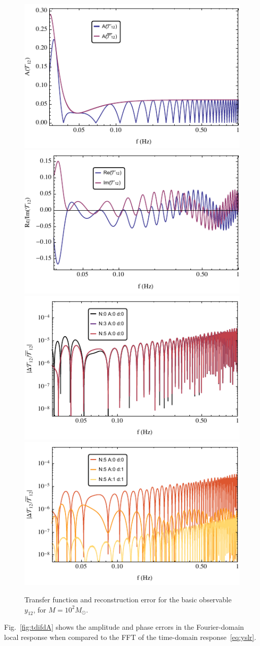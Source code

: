 \documentclass[aps,showpacs,twocolumn,
prd,superscriptaddress,nofootinbib]{revtex4-1}
\newcommand{\Msol}{M_{\odot}}
\begin{document}
\begin{figure}
  \centering
  \includegraphics[width=.48\linewidth]{plots/LISAtransferM1e2y12Lamp.pdf}
  \hspace{0.2cm}
  \includegraphics[width=.48\linewidth]{plots/LISAtransferM1e2y12LReIm.pdf}
  \includegraphics[width=.48\linewidth]{plots/LISAerrorM1e2y12LcorrPsi.pdf}
  \hspace{0.2cm}
  \includegraphics[width=.48\linewidth]{plots/LISAerrorM1e2y12LcorrAd.pdf}
  \caption{Transfer function and reconstruction error for the basic observable $y_{12}$, for $M=10^{2} \Msol$.}
  \label{fig:prectoymodel}
\end{figure}

Fig.~\ref{fig:tdifdA} shows the amplitude and phase errors in the Fourier-domain local response when compared to the FFT of the time-domain response~\eqref{eq:yslr}.
\end{document}
